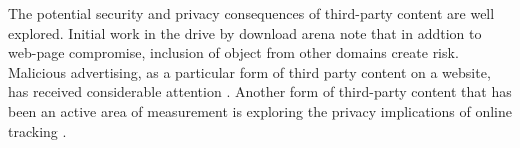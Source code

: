 The potential security and privacy consequences of third-party content
are well explored. Initial work in the drive by download arena
\cite{Provos:2008:YIP:1496711.1496712,Cova:2010:DAD:1772690.1772720,Provos:2007:GBA:1323128.1323132}
note that in addtion to web-page compromise, inclusion of object from
other domains create risk. Malicious advertising, as a particular form
of third party content on a website, has received considerable
attention
\cite{Zarras:2014:DAM:2663716.2663719,Li:2012:KYE:2382196.2382267}. Another
form of third-party content that has been an active area of
measurement is exploring the privacy implications of online tracking
\cite{mayer2012third,roesner2012detecting}.


